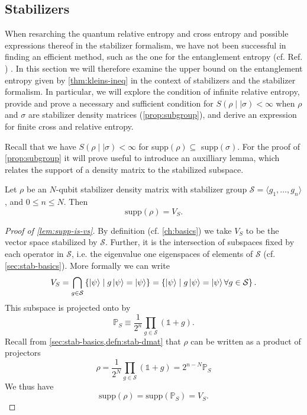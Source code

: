 \subsection{Stabilizers}\label{sec:rel-ent-stab}
When resarching the quantum relative entropy and cross entropy and possible
expressions thereof in the stabilizer formalism, we have not been successful in
finding an efficient method, such as the one for the entanglement entropy
(cf. Ref. \cite{fattalEntanglementStabilizerFormalism2004})
\cite{veitchResourceTheoryStabilizer2014,niekampEntropicUncertaintyRelations2012,leoneStabilizerEntropiesAre2024,leonePhaseTransitionStabilizer2024,wuEntanglementUpperBound2011,vedralEntanglementMeasuresPurification1998,lindenQuantumEntropyCone2013,buExtremalityStabilizerStates2024,arabLectureNotesQuantum2024,nielsenQuantumComputationQuantum2010}.
In this section we will therefore examine the upper bound on the entanglement entropy
given by \cref{thm:kleins-ineq} in the context of stabilizers and the
stabilizer formalism. In particular, we will explore the condition of infinite
relative entropy,
provide and prove a necessary and sufficient condition
for $S(\rho\mid\mid\sigma)<\infty$ when $\rho$ and $\sigma$ are stabilizer
density matrices (\cref{prop:subgroup}), and derive an expression for finite cross
and relative entropy.

Recall that we have $S(\rho\mid\mid\sigma)<\infty$ for
supp$(\rho)\subseteq$ supp$(\sigma)$. For the proof of \cref{prop:subgroup} it
will prove useful to introduce an auxilliary lemma, which relates the support
of a density matrix to the stabilized subspace.
\begin{lem}\label{lem:supp-is-vs}
  Let $\rho$ be an $N$-qubit stabilizer density matrix with stabilizer group
  $\mathcal{S} = \langle
  g_1, \ldots, g_n \rangle$, and $0\leq n \leq N$.
  Then \[ \mathrm{supp}(\rho) = V_{S}.\]
\end{lem}
\begin{proof}[Proof of \cref{lem:supp-is-vs}]
  By definition (cf. \cref{ch:basics}) we take $V_{S}$ to be the vector space
  stabilized by $\mathcal{S}$.  Further, it is the intersection of subspaces fixed by
  each operator in $\mathcal{S}$, i.e. the eigenvalue one eigenspaces of
  elements of $\mathcal{S}$
  (cf. \cref{sec:stab-basics}). More
  formally we can write
  \[ 
    V_S = \bigcap_{g \in \mathcal{S}}  \left\{\ket{\psi} \mid g\ket{\psi} =
    \ket{\psi}\right\} = \left\{\ket{\psi} \mid g\ket{\psi} =
  \ket{\psi} \forall g \in \mathcal{S}\right\}.
  \]
  This subspace is projected onto by
  \[ \mathbb{P}_S \equiv \frac{1}{2^n} \prod_{g\in \mathcal{S}} \left(\mathds{1} + g\right).\]
  Recall from \cref{sec:stab-basics,defn:stab-dmat} that $\rho$ can be written as a product of
  projectors
  \[ \rho = \frac{1}{2^N} \prod_{g \in \mathcal{S}} \left(\mathds{1} + g\right)
  = 2^{n-N} \mathbb{P}_S \]
  We thus have
  \[ \mathrm{supp}(\rho) = \mathrm{supp}(\mathbb{P}_S) = V_S. \]
\end{proof}

